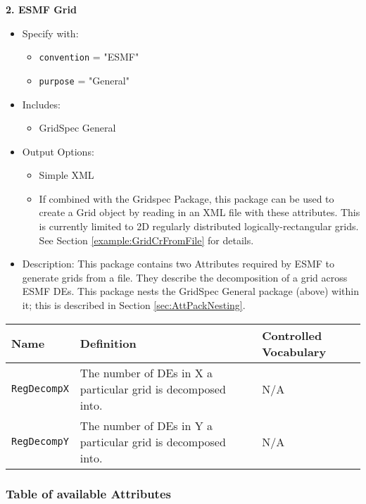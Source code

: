 \vspace{.20in}

{\bf 2. ESMF Grid}

\label{ESMFGridAttributePackage}

\begin{itemize}
    \item Specify with:
    \begin{itemize}
        \item {\tt convention} = "ESMF"
        \item {\tt purpose} = "General"
    \end{itemize}
    \item Includes: 
    \begin{itemize}
        \item GridSpec General
    \end{itemize}
    \item Output Options:
    \begin{itemize}
        \item Simple XML
        \item If combined with the Gridspec Package, this package can be used to create a Grid object by reading in an XML file with these attributes. This is currently limited to 2D regularly distributed logically-rectangular grids. See Section \ref{example:GridCrFromFile} for details. 
    \end{itemize}
    \item Description: This package contains two Attributes required by ESMF to generate grids from a file. They describe the decomposition of a grid across ESMF DEs.  This package nests the GridSpec General package (above) within it; this is described in Section \ref{sec:AttPackNesting}.
\end{itemize}

\begin{longtable}{|p{5cm}|p{5cm}|p{35mm}|}
\hline\hline
{\bf Name} & {\bf Definition} & {\bf Controlled Vocabulary} \\
\hline\hline
{\tt RegDecompX} & The number of DEs in X a particular grid is decomposed into.& N/A\\
{\tt RegDecompY} & The number of DEs in Y a particular grid is decomposed into.& N/A\\
\hline\hline
\end{longtable}

\vspace{.20in}

\subsubsection{Table of available Attributes}


